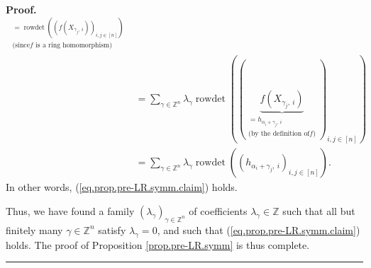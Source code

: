 \documentclass[numbers=enddot,12pt,final,onecolumn,notitlepage,english]{scrartcl}%
\theoremstyle{definition}
\newenvironment{proof}[1][Proof]{\noindent\textbf{#1.} }{\ \rule{0.5em}{0.5em}}
\let\sumnonlimits\sum
\renewcommand{\sum}{\sumnonlimits\limits}
\begin{document}
\begin{proof}
\begin{align*}
{}_{\substack{=\operatorname*{rowdet}\left(  \left(  f\left(  X_{\gamma
_{j},\ i}\right)  \right)  _{i,j\in\left[  n\right]  }\right)  \\\text{(since
}f\text{ is a ring homomorphism)}}}\\
&  =\sum_{\gamma\in\mathbb{Z}^{n}}\lambda_{\gamma}\operatorname*{rowdet}%
\left(  \left(  \underbrace{f\left(  X_{\gamma_{j},\ i}\right)  }%
_{\substack{=h_{\alpha_{i}+\gamma_{j},\ i}\\\text{(by the definition of
}f\text{)}}}\right)  _{i,j\in\left[  n\right]  }\right) \\
&  =\sum_{\gamma\in\mathbb{Z}^{n}}\lambda_{\gamma}\operatorname*{rowdet}%
\left(  \left(  h_{\alpha_{i}+\gamma_{j},\ i}\right)  _{i,j\in\left[
n\right]  }\right)  .
\end{align*}
In other words, (\ref{eq.prop.pre-LR.symm.claim}) holds.

Thus, we have found a family $\left(  \lambda_{\gamma}\right)  _{\gamma
\in\mathbb{Z}^{n}}$ of coefficients $\lambda_{\gamma}\in\mathbb{Z}$ such that
all but finitely many $\gamma\in\mathbb{Z}^{n}$ satisfy $\lambda_{\gamma}=0$,
and such that (\ref{eq.prop.pre-LR.symm.claim}) holds. The proof of
Proposition \ref{prop.pre-LR.symm} is thus complete.
\end{proof}
\end{document}
